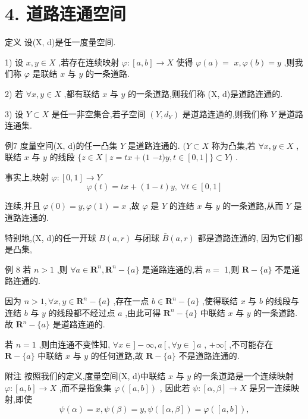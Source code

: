 \section*{4. 道路连通空间}

定义 设(X, d)是任一度量空间.

1) 设 $x,y \in  X$ ,若存在连续映射 $\varphi  : \left\lbrack  {a,b}\right\rbrack   \rightarrow  X$ 使得 $\varphi \left( a\right)  =$  $x,\varphi \left( b\right)  = y$ ,则我们称 $\varphi$ 是联结 $x$ 与 $y$ 的一条道路.

2) 若 $\forall x,y \in  X$ ,都有联结 $x$ 与 $y$ 的一条道路,则我们称 (X, d)是道路连通的.

3) 设 $Y \subset  X$ 是任一非空集合,若子空间 $\left( {Y,{d}_{Y}}\right)$ 是道路连通的,则我们称 $Y$ 是道路连通集.

例7 度量空间(X, d)的任一凸集 $Y$ 是道路连通的. $(Y \subset  X$ 称为凸集,若 $\forall x,y \in  X$ ,联结 $x$ 与 $y$ 的线段 $\{ z \in  X \mid  z = {tx} + (1$  $- t)y,t \in  \left\lbrack  {0,1}\right\rbrack  \}  \subset  Y)$ .

事实上,映射 $\varphi  : \left\lbrack  {0,1}\right\rbrack   \rightarrow  Y$
$$\varphi \left( t\right)  = {tx} + \left( {1 - t}\right) y,\;\forall t \in  \left\lbrack  {0,1}\right\rbrack$$

连续,并且 $\varphi \left( 0\right)  = y,\varphi \left( 1\right)  = x$ ,故 $\varphi$ 是 $Y$ 的连结 $x$ 与 $y$ 的一条道路,从而 $Y$ 是道路连通的.

特别地,(X, d)的任一开球 $B\left( {a,r}\right)$ 与闭球 $\bar{B}\left( {a,r}\right)$ 都是道路连通的, 因为它们都是凸集,

例 8 若 $n > 1$ ,则 $\forall a \in  {\mathbf{R}}^{n},{\mathbf{R}}^{n} - \{ a\}$ 是道路连通的,若 $n =$ 1,则 $\mathbf{R} - \{ a\}$ 不是道路连通的.

因为 $n > 1,\forall x,y \in  {\mathbf{R}}^{n} - \{ a\}$ ,存在一点 $b \in  {\mathbf{R}}^{n} - \{ a\}$ ,使得联结 $x$ 与 $b$ 的线段与连结 $b$ 与 $y$ 的线段都不经过点 $a$ ,由此可得 ${\mathbf{R}}^{n} - \{ a\}$ 中联结 $x$ 与 $y$ 的一条道路. 故 ${\mathbf{R}}^{n} - \{ a\}$ 是道路连通的.

若 $n = 1$ ,则由连通不变性知, $\forall x \in  \rbrack  - \infty ,a\left\lbrack  {,\forall y \in  }\right\rbrack  a$ , $+ \infty \lbrack$ ,不可能存在 $\mathbf{R} - \{ a\}$ 中联结 $x$ 与 $y$ 的任何道路,故 $\mathbf{R} - \{ a\}$ 不是道路连通的.

附注 按照我们的定义,度量空间(X, d)中联结 $x$ 与 $y$ 的一条道路是一个连续映射 $\varphi  : \left\lbrack  {a,b}\right\rbrack   \rightarrow  X$ ,而不是指象集 $\varphi \left( \left\lbrack  {a,b}\right\rbrack  \right)$ , 因此若 $\psi  : \left\lbrack  {\alpha ,\beta }\right\rbrack   \rightarrow  X$ 是另一连续映射,即使
$$\psi \left( \alpha \right)  = x,\psi \left( \beta \right)  = y,\psi \left( \left\lbrack  {\alpha ,\beta }\right\rbrack  \right)  = \varphi \left( \left\lbrack  {a,b}\right\rbrack  \right) ,$$


